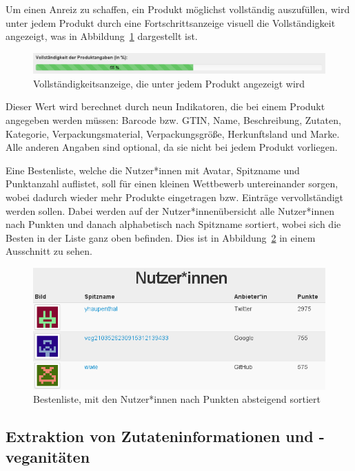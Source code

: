 Um einen Anreiz zu schaffen, ein Produkt möglichst vollständig auszufüllen, 
wird unter jedem Produkt durch eine Fortschrittsanzeige visuell die 
Vollständigkeit angezeigt, was in Abbildung~\ref{img:integrity} dargestellt ist.

\begin{figure}[ht]
  \centering
  \includegraphics[scale=0.45]{pics/integrity.png}
  \caption{Vollständigkeitsanzeige, die unter jedem Produkt angezeigt wird}
  \label{img:integrity}
\end{figure}

Dieser Wert wird berechnet durch neun Indikatoren, die bei einem Produkt 
angegeben werden müssen: 
Barcode bzw. \ac{GTIN}, Name, Beschreibung, Zutaten, 
Kategorie, Verpackungsmaterial, Verpackungsgröße, Herkunftsland und Marke.
Alle anderen Angaben sind optional, da sie nicht bei jedem Produkt 
vorliegen.

Eine Bestenliste, welche die Nutzer*innen mit Avatar, Spitzname und
Punktanzahl auflistet, soll für einen kleinen Wettbewerb untereinander
sorgen, wobei dadurch wieder mehr Produkte eingetragen bzw. Einträge
vervollständigt werden sollen.
Dabei werden auf der Nutzer*innenübersicht alle Nutzer*innen nach Punkten und 
danach alphabetisch nach Spitzname sortiert, wobei sich die Besten in der Liste 
ganz oben befinden. Dies ist in Abbildung~\ref{img:leaderboard} in einem 
Ausschnitt zu sehen.

\begin{figure}[ht]
  \centering
  \includegraphics[scale=0.5]{pics/leaderboard.png}
  \caption{Bestenliste, mit den Nutzer*innen nach Punkten absteigend sortiert}
  \label{img:leaderboard}
\end{figure}

\subsection{Extraktion von Zutateninformationen und -veganitäten}
\label{sec:implementation:ingredients}

